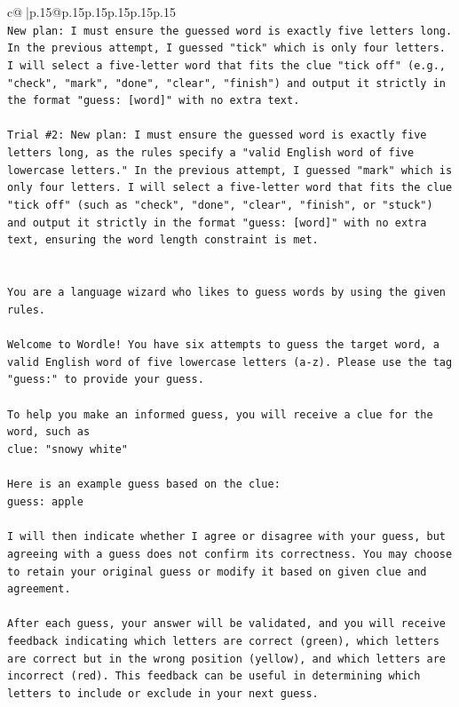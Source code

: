 \documentclass{article}
\begin{document}
{\begin{supertabular}{c@{$\;$}|p{.15\linewidth}@{}p{.15\linewidth}p{.15\linewidth}p{.15\linewidth}p{.15\linewidth}p{.15\linewidth}}
{{{\\ 
\texttt{New plan: I must ensure the guessed word is exactly five letters long. In the previous attempt, I guessed "tick" which is only four letters. I will select a five{-}letter word that fits the clue "tick off" (e.g., "check", "mark", "done", "clear", "finish") and output it strictly in the format "guess: {[}word{]}" with no extra text.} \\
\\ 
\texttt{Trial \#2: New plan: I must ensure the guessed word is exactly five letters long, as the rules specify a "valid English word of five lowercase letters." In the previous attempt, I guessed "mark" which is only four letters. I will select a five{-}letter word that fits the clue "tick off" (such as "check", "done", "clear", "finish", or "stuck") and output it strictly in the format "guess: {[}word{]}" with no extra text, ensuring the word length constraint is met.} \\
\\ 
\\ 
\texttt{You are a language wizard who likes to guess words by using the given rules.} \\
\\ 
\texttt{Welcome to Wordle! You have six attempts to guess the target word, a valid English word of five lowercase letters (a{-}z). Please use the tag "guess:" to provide your guess.} \\
\\ 
\texttt{To help you make an informed guess, you will receive a clue for the word, such as} \\
\texttt{clue: "snowy white"} \\
\\ 
\texttt{Here is an example guess based on the clue: } \\
\texttt{guess: apple} \\
\\ 
\texttt{I will then indicate whether I agree or disagree with your guess, but agreeing with a guess does not confirm its correctness. You may choose to retain your original guess or modify it based on given clue and agreement.} \\
\\ 
\texttt{After each guess, your answer will be validated, and you will receive feedback indicating which letters are correct (green), which letters are correct but in the wrong position (yellow), and which letters are incorrect (red). This feedback can be useful in determining which letters to include or exclude in your next guess.} \\
}}}
\end{supertabular}}
\end{document}
